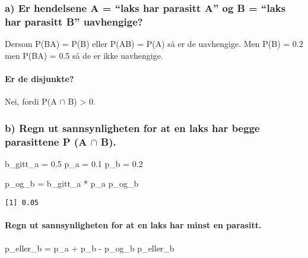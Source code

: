 \documentclass[
  12pt,
  a4paper,
  DIV=11,
  numbers=noendperiod]{scrartcl}
\let\oldparagraph\paragraph
\renewcommand{\paragraph}[1]{\oldparagraph{#1}\mbox{}}
\newenvironment{Shaded}{\begin{snugshade}}{\end{snugshade}}
\newcommand{\FloatTok}[1]{\textcolor[rgb]{0.68,0.00,0.00}{#1}}
\newcommand{\NormalTok}[1]{\textcolor[rgb]{0.00,0.23,0.31}{#1}}
\newcommand{\OtherTok}[1]{\textcolor[rgb]{0.00,0.23,0.31}{#1}}
\newcommand{\SpecialCharTok}[1]{\textcolor[rgb]{0.37,0.37,0.37}{#1}}
\begin{document}
\subsubsection{a) Er hendelsene A = ``laks har parasitt A'' og B =
``laks har parasitt B''
uavhengige?}\label{a-er-hendelsene-a-laks-har-parasitt-a-og-b-laks-har-parasitt-b-uavhengige}

Dersom P(B\textbar A) = P(B) eller P(A\textbar B) = P(A) så er de
uavhengige. Men P(B) = 0.2 men P(B\textbar A) = 0.5 så de er ikke
uavhengige.

\paragraph{Er de disjunkte?}\label{er-de-disjunkte}

Nei, fordi P(A \(\cap\) B) \textgreater{} 0.

\subsubsection{\texorpdfstring{b) Regn ut sannsynligheten for at en laks
har begge parasittene P (A \(\cap\)
B).}{b) Regn ut sannsynligheten for at en laks har begge parasittene P (A \textbackslash cap B).}}\label{b-regn-ut-sannsynligheten-for-at-en-laks-har-begge-parasittene-p-a-cap-b.}

\begin{Shaded}
\begin{Highlighting}[]
\NormalTok{b\_gitt\_a }\OtherTok{=} \FloatTok{0.5}
\NormalTok{p\_a }\OtherTok{=} \FloatTok{0.1}
\NormalTok{p\_b }\OtherTok{=} \FloatTok{0.2}

\NormalTok{p\_og\_b }\OtherTok{=}\NormalTok{ b\_gitt\_a }\SpecialCharTok{*}\NormalTok{ p\_a}
\NormalTok{p\_og\_b}
\end{Highlighting}
\end{Shaded}

\begin{verbatim}
[1] 0.05
\end{verbatim}

\paragraph{Regn ut sannsynligheten for at en laks har minst en
parasitt.}\label{regn-ut-sannsynligheten-for-at-en-laks-har-minst-en-parasitt.}

\begin{Shaded}
\begin{Highlighting}[]
\NormalTok{p\_eller\_b }\OtherTok{=}\NormalTok{ p\_a }\SpecialCharTok{+}\NormalTok{ p\_b }\SpecialCharTok{{-}}\NormalTok{ p\_og\_b}
\NormalTok{p\_eller\_b}
\end{Highlighting}
\end{Shaded}
\end{document}
